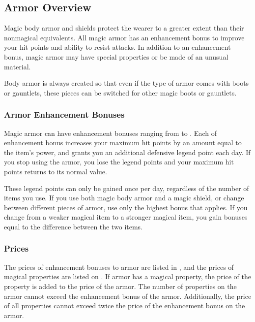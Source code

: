     \subsection{Armor Overview}

        Magic body armor and shields protect the wearer to a greater extent than their nonmagical equivalents.
        All magic armor has an enhancement bonus to improve your hit points and ability to resist attacks.
        In addition to an enhancement bonus, magic armor may have special properties or be made of an unusual material.

        Body armor is always created so that even if the type of armor comes with boots or gauntlets, these pieces can be switched for other magic boots or gauntlets.

        \subsubsection{Armor Enhancement Bonuses}\label{Armor Enhancement Bonuses}

            Magic armor can have enhancement bonuses ranging from  to .
            Each  of enhancement bonus increases your maximum hit points by an amount equal to the item's power, and grants you an additional defensive legend point each day.
            If you stop using the armor, you lose the legend points and your maximum hit points returns to its normal value.

            These legend points can only be gained once per day, regardless of the number of items you use.
            If you use both magic body armor and a magic shield, or change between different pieces of armor, use only the highest bonus that applies.
            If you change from a weaker magical item to a stronger magical item, you gain bonuses equal to the difference between the two items.

        \subsubsection{Prices}\label{Armor Prices}
            The prices of enhancement bonuses to armor are listed in , and the prices of magical properties are listed on .
            If armor has a magical property, the price of the property is added to the price of the armor.
            The number of properties on the armor cannot exceed the enhancement bonus of the armor.
            Additionally, the price of all properties cannot exceed twice the price of the enhancement bonus on the armor.

